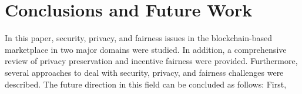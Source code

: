 \section{Conclusions and Future Work}
\label{sec:conclusions}
In this paper, security, privacy, and fairness issues in the blockchain-based marketplace in two major domains were studied.
In addition, a comprehensive review of privacy preservation and incentive fairness were provided.
Furthermore, several approaches to deal with security, privacy, and fairness challenges were described.
The future direction in this field can be concluded as follows:
First, 

